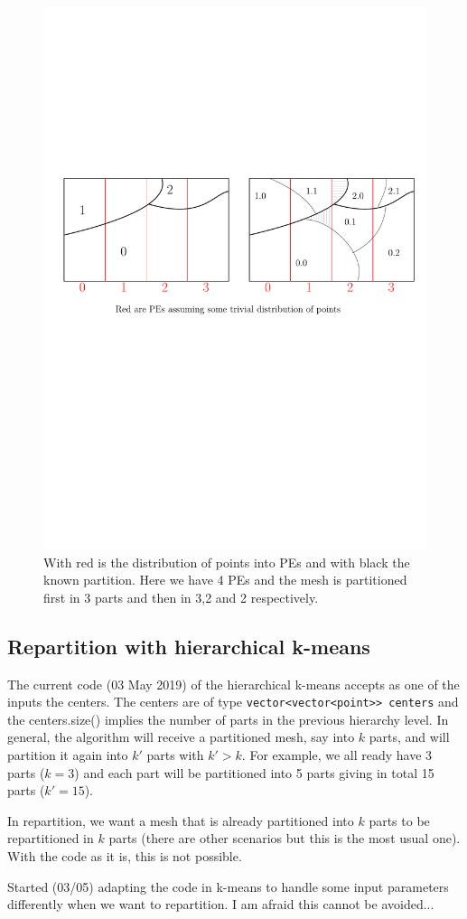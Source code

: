 \documentclass[a4paper,10pt]{article}
\begin{document}
\begin{figure}
\includegraphics[scale=0.7]{heterog_tree_part_with_PEs}
\caption{With red is the distribution of points into PEs and with black the known partition.
Here we have 4 PEs and the mesh is partitioned first in 3 parts and then in 3,2 and 2 respectively.}
\label{fig:heterog_withPEs}
\end{figure}


\subsection*{Repartition with hierarchical k-means}

The current code (03 May 2019) of the hierarchical k-means accepts as one of the inputs the centers.
The centers are of type \texttt{vector<vector<point>> centers} and the centers.size() implies
the number of parts in the previous hierarchy level. In general, the algorithm will receive
a partitioned mesh, say into $k$ parts, and will partition it again into $k'$ parts with $k'>k$.
For example, we all ready have 3 parts ($k=3$) and each part will be partitioned into 5 parts
giving in total 15 parts ($k'=15$). 

In repartition, we want a mesh that is already partitioned into $k$ parts to be repartitioned in $k$
parts (there are other scenarios but this is the most usual one). With the code as it is, this is not
possible. 

Started (03/05) adapting the code in k-means to handle some input parameters differently when we
want to repartition. I am afraid this cannot be avoided...
\end{document}
